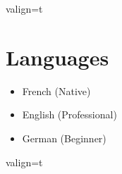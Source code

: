 \documentclass[a4paper,10pt]{article}
\begin{document}
\begin{adjustbox}{valign=t}
\begin{minipage}{0.32\textwidth}
        \section*{Languages}
        \raggedright
        \begin{itemize}
            \itemsep0em
            \item French (Native)
            \item English (Professional)
            \item German (Beginner)
        \end{itemize}
    \end{minipage}
\end{adjustbox}
\hfill
\begin{adjustbox}{valign=t}
    \begin{minipage}{0.02\textwidth}
        \MyVerticalRule
    \end{minipage}
\end{adjustbox}
\hfill
\end{document}
